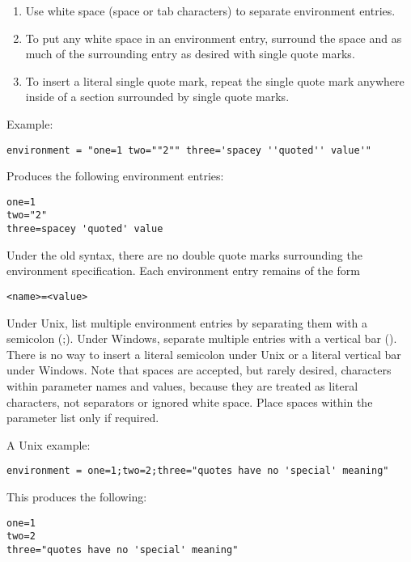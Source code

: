 \begin{description}
\begin{enumerate}
\item Use white space (space or tab characters) to separate environment entries.

\item To put any white space in an environment entry, surround
the space and as much of the surrounding entry as desired with
single quote marks.

\item To insert a literal single quote mark, repeat the single quote mark
anywhere inside of a section surrounded by single quote marks.

\end{enumerate}

Example:

\begin{verbatim}
environment = "one=1 two=""2"" three='spacey ''quoted'' value'"
\end{verbatim}

Produces the following environment entries:

\begin{verbatim}
one=1
two="2"
three=spacey 'quoted' value
\end{verbatim}

Under the old syntax, there are no double quote marks surrounding the
environment specification.  Each environment entry remains of the form
\begin{verbatim}
<name>=<value>
\end{verbatim}
Under Unix, list multiple environment entries by separating them with
a semicolon (;).  Under Windows, separate multiple entries with a
vertical bar (\Bar).  There is no way to insert a literal semicolon
under Unix or a literal vertical bar under Windows.  Note that spaces
are accepted, but rarely desired, characters within parameter names
and values, because they are treated as literal characters, not
separators or ignored white space.  Place spaces within the parameter
list only if required.

A Unix example:

\begin{verbatim}
environment = one=1;two=2;three="quotes have no 'special' meaning"
\end{verbatim}

This produces the following:

\begin{verbatim}
one=1
two=2
three="quotes have no 'special' meaning"
\end{verbatim}


\end{description}
